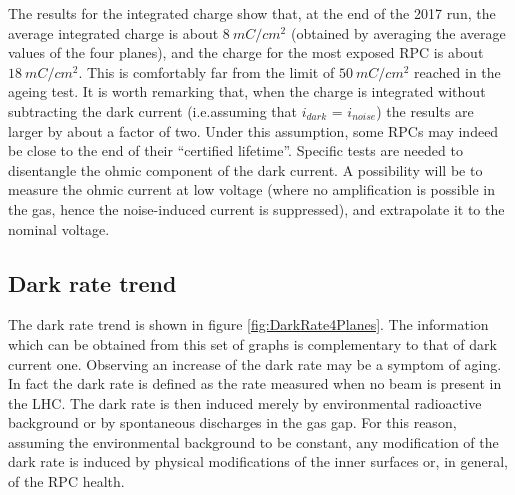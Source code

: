 The results for the integrated charge show that, at the end of the 2017 run, the average integrated charge is about $8\ mC/cm^2$ (obtained by averaging the average values of the four planes), and the charge for the most exposed RPC is about $18\ mC/cm^2$. 
This is comfortably far from the limit of $50\ mC/cm^2$ reached in the ageing test. 
It is worth remarking that, when the charge is integrated without subtracting the dark current (i.e.assuming that $i_{dark}$ = $i_{noise}$) the results are larger by about a factor of two. 
Under this assumption, some RPCs may indeed be close to the end of their “certified lifetime”. 
Specific tests are needed to disentangle the ohmic component of the dark current. 
A possibility will be to measure the ohmic current at low voltage (where no amplification is possible in the gas, hence the noise-induced current is suppressed), and extrapolate it to the nominal voltage.

\subsection{Dark rate trend}
The dark rate trend is shown in figure \ref{fig:DarkRate4Planes}.
The information which can be obtained from this set of graphs is complementary to that of dark current one.
Observing an increase of the dark rate may be a symptom of aging.
In fact the dark rate is defined as the rate measured when no beam is present in the LHC.
The dark rate is then induced merely by environmental radioactive background or by spontaneous discharges in the gas gap.
For this reason, assuming the environmental background to be constant, any modification of the dark rate is induced by physical modifications of the inner surfaces or, in general, of the RPC health.

